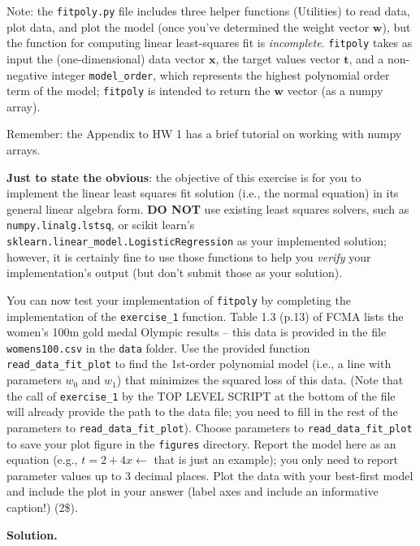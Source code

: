 \documentclass[10pt]{article}
\begin{document}
\begin{itemize}
Note: the {\tt fitpoly.py} file includes three helper functions (Utilities) to read data, plot data, and plot the model (once you've determined the weight vector $\mathbf{w}$), but the function for computing linear least-squares fit is {\em incomplete}.  {\tt fitpoly} takes as input the (one-dimensional) data vector $\mathbf{x}$, the target values vector $\mathbf{t}$, and a non-negative integer {\tt model\_order}, which represents the highest polynomial order term of the model; {\tt fitpoly} is intended to return the $\mathbf{w}$ vector (as a numpy array).

Remember: the Appendix to HW 1 has a brief tutorial on working with numpy arrays.

{\bf Just to state the obvious}: the objective of this exercise is for you to implement the linear least squares fit solution (i.e., the normal equation) in its general linear algebra form.  {\bf DO NOT} use existing least squares solvers, such as {\tt numpy.linalg.lstsq}, or scikit learn's \\{\tt sklearn.linear\_model.LogisticRegression} as your implemented solution; however, it is certainly fine to use those functions to help you {\em verify} your implementation's output (but don't submit those as your solution).

You can now test your implementation of {\tt fitpoly} by completing the implementation of the {\tt exercise\_1} function. Table 1.3 (p.13) of FCMA lists the women's 100m gold medal Olympic results -- this data is provided in the file {\tt womens100.csv} in the {\tt data} folder. Use the provided function {\tt read\_data\_fit\_plot} to find the 1st-order polynomial model (i.e., a line with parameters $w_0$ and $w_1$) that minimizes the squared loss of this data. (Note that the call of {\tt exercise\_1} by the TOP LEVEL SCRIPT at the bottom of the file will already provide the path to the data file; you need to fill in the rest of the parameters to {\tt read\_data\_fit\_plot}). Choose parameters to {\tt read\_data\_fit\_plot} to save your plot figure in the {\tt figures} directory. Report the model here as an equation (e.g., $t = 2 + 4x \leftarrow$ that is just an example); you only need to report parameter values up to 3 decimal places.  Plot the data with your best-first model and include the plot in your answer (label axes and include an informative caption!) (2\$).

{\bf Solution.} 




\end{itemize}
\end{document}
